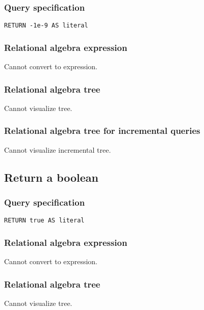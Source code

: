 \subsubsection*{Query specification}

\begin{lstlisting}
RETURN -1e-9 AS literal
\end{lstlisting}

\subsubsection*{Relational algebra expression}

Cannot convert to expression.

\subsubsection*{Relational algebra tree}

Cannot visualize tree.

\subsubsection*{Relational algebra tree for incremental queries}

Cannot visualize incremental tree.

\subsection{Return a boolean}

\subsubsection*{Query specification}

\begin{lstlisting}
RETURN true AS literal
\end{lstlisting}

\subsubsection*{Relational algebra expression}

Cannot convert to expression.

\subsubsection*{Relational algebra tree}

Cannot visualize tree.


